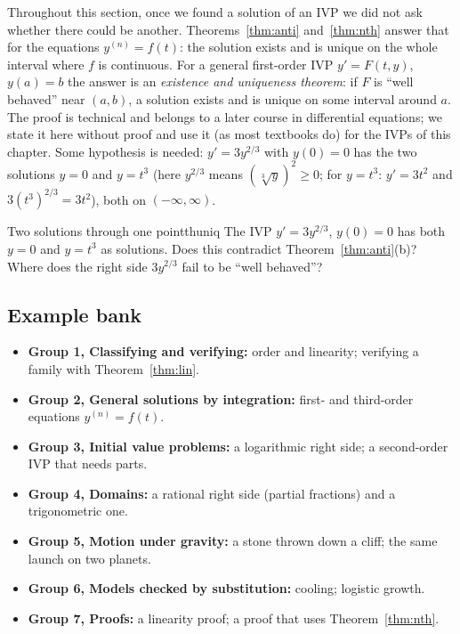 \documentclass[11pt]{article}
\begin{document}
\begin{remark}
Throughout this section, once we found a solution of an IVP we did not ask whether there could be another. Theorems~\ref{thm:anti} and~\ref{thm:nth} answer that for the equations $y^{(n)}=f(t)$: the solution exists and is unique on the whole interval where $f$ is continuous. For a general first-order IVP $y'=F(t,y)$, $y(a)=b$ the answer is an \emph{existence and uniqueness theorem}: if $F$ is ``well behaved'' near $(a,b)$, a solution exists and is unique on some interval around $a$. The proof is technical and belongs to a later course in differential equations; we state it here without proof and use it (as most textbooks do) for the IVPs of this chapter. Some hypothesis is needed: $y'=3y^{2/3}$ with $y(0)=0$ has the two solutions $y=0$ and $y=t^3$ (here $y^{2/3}$ means $\left(\sqrt[3]y\right)^2\ge0$; for $y=t^3$: $y'=3t^2$ and $3\left(t^3\right)^{2/3}=3t^2$), both on $(-\infty,\infty)$.
\end{remark}

\begin{think}{Two solutions through one point}{thuniq}
The IVP $y'=3y^{2/3}$, $y(0)=0$ has both $y=0$ and $y=t^3$ as solutions. Does this contradict Theorem~\ref{thm:anti}(b)? Where does the right side $3y^{2/3}$ fail to be ``well behaved''?
\end{think}

\subsection*{Example bank}

\begin{remark}
\begin{itemize}[nosep]
  \item \textbf{Group 1, Classifying and verifying:} order and linearity; verifying a family with Theorem~\ref{thm:lin}.
  \item \textbf{Group 2, General solutions by integration:} first- and third-order equations $y^{(n)}=f(t)$.
  \item \textbf{Group 3, Initial value problems:} a logarithmic right side; a second-order IVP that needs parts.
  \item \textbf{Group 4, Domains:} a rational right side (partial fractions) and a trigonometric one.
  \item \textbf{Group 5, Motion under gravity:} a stone thrown down a cliff; the same launch on two planets.
  \item \textbf{Group 6, Models checked by substitution:} cooling; logistic growth.
  \item \textbf{Group 7, Proofs:} a linearity proof; a proof that uses Theorem~\ref{thm:nth}.
\end{itemize}
\end{remark}
\end{document}

